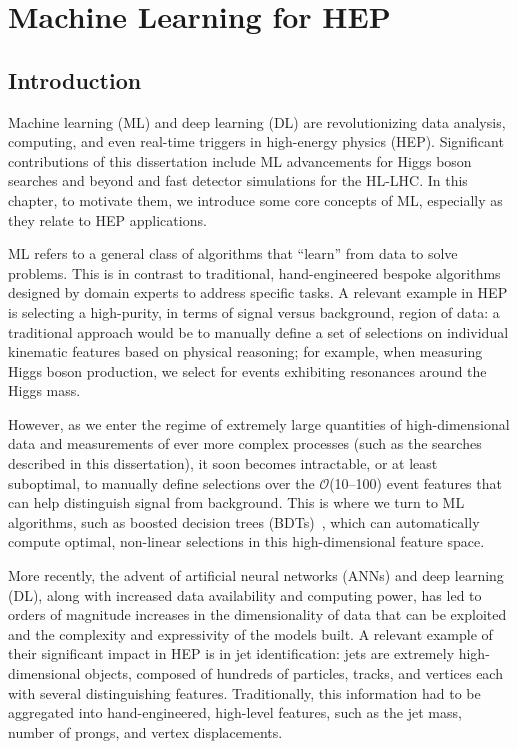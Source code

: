 \chapter{Machine Learning for HEP}
\label{sec:03_ml}

\section{Introduction}

Machine learning (ML) and deep learning (DL) are revolutionizing data analysis, computing, and even real-time triggers in high-energy physics (HEP).
Significant contributions of this dissertation include ML advancements for Higgs boson searches and beyond and fast detector simulations for the HL-LHC.
In this chapter, to motivate them, we introduce some core concepts of ML, especially as they relate to HEP applications.

ML refers to a general class of algorithms that ``learn'' from data to solve problems.
This is in contrast to traditional, hand-engineered bespoke algorithms designed by domain experts to address specific tasks.
A relevant example in HEP is selecting a high-purity, in terms of signal versus background, region of data: a traditional approach would be to manually define a set of selections on individual kinematic features based on physical reasoning; for example, when measuring Higgs boson production, we select for events exhibiting resonances around the Higgs mass.

However, as we enter the regime of extremely large quantities of high-dimensional data and measurements of ever more complex processes (such as the \HH searches described in this dissertation), it soon becomes intractable, or at least suboptimal, to manually define selections over the $\mathcal O$(10--100) event features that can help distinguish signal from background.
This is where we turn to ML algorithms, such as boosted decision trees (BDTs)~\cite{hastie2009boosting}, which can automatically compute optimal, non-linear selections in this high-dimensional feature space.

More recently, the advent of artificial neural networks (ANNs) and deep learning (DL), along with increased data availability and computing power, has led to orders of magnitude increases in the dimensionality of data that can be exploited and the complexity and expressivity of the models built.
A relevant example of their significant impact in HEP is in jet identification: jets are extremely high-dimensional objects, composed of hundreds of particles, tracks, and vertices each with several distinguishing features.
Traditionally, this information had to be aggregated into hand-engineered, high-level features, such as the jet mass, number of prongs, and vertex displacements.

